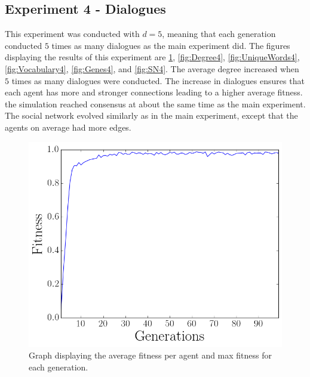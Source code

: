 \subsection{Experiment 4 - Dialogues}
This experiment was conducted with $d = 5$, meaning that each generation conducted $5$ times as many dialogues as the main experiment did. The figures displaying the results of this experiment are \ref{fig:Fitness4}, \ref{fig:Degree4}, \ref{fig:UniqueWords4}, \ref{fig:Vocabulary4}, \ref{fig:Genes4}, and \ref{fig:SN4}. The average degree increased when $5$ times as many dialogues were conducted. The increase in dialogues ensures that each agent has more and stronger connections leading to a higher average fitness. the simulation reached consensus at about the same time as the main experiment. The social network evolved similarly as in the main experiment, except that the agents on average had more edges.
\begin{figure}[htbp]
    \centering
    \includegraphics[scale=0.5]{fig/Results/Exp4/Fitness1}
    \caption{Graph displaying the average fitness per agent and max fitness for each generation.}
    \label{fig:Fitness4}
\end{figure}
